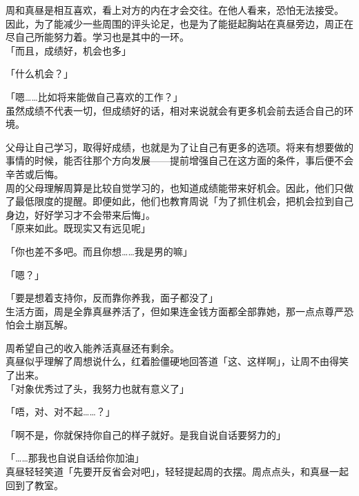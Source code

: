 周和真昼是相互喜欢，看上对方的内在才会交往。在他人看来，恐怕无法接受。\\

因此，为了能减少一些周围的评头论足，也是为了能挺起胸站在真昼旁边，周正在尽自己所能努力着。学习也是其中的一环。\\

「而且，成绩好，机会也多」

「什么机会？」

「嗯……比如将来能做自己喜欢的工作？」\\

虽然成绩不代表一切，但成绩好的话，相对来说就会有更多机会前去适合自己的环境。

父母让自己学习，取得好成绩，也就是为了让自己有更多的选项。将来有想要做的事情的时候，能否往那个方向发展——提前增强自己在这方面的条件，事后便不会辛苦或后悔。\\

周的父母理解周算是比较自觉学习的，也知道成绩能带来好机会。因此，他们只做了最低限度的提醒。即便如此，他们也教育周说「为了抓住机会，把机会拉到自己身边，好好学习才不会带来后悔」。\\

「原来如此。既现实又有远见呢」

「你也差不多吧。而且你想……我是男的嘛」

「嗯？」

「要是想着支持你，反而靠你养我，面子都没了」\\

生活方面，周是全靠真昼养活了，但如果连金钱方面都全部靠她，那一点点尊严恐怕会土崩瓦解。

周希望自己的收入能养活真昼还有剩余。\\

真昼似乎理解了周想说什么，红着脸僵硬地回答道「这、这样啊」，让周不由得笑了出来。\\

「对象优秀过了头，我努力也就有意义了」

「唔，对、对不起……？」

「啊不是，你就保持你自己的样子就好。是我自说自话要努力的」

「……那我也自说自话给你加油」\\

真昼轻轻笑道「先要开反省会对吧」，轻轻提起周的衣摆。周点点头，和真昼一起回到了教室。
